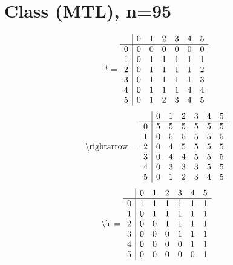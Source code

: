 \documentclass[11pt]{article}
\begin{document}
\section{Class (MTL), n=95}
\[\text{*} = 
\begin{array}{r | r r r r r r}
 & 0 & 1 & 2 & 3 & 4 & 5 \\ \hline
0 & 0 & 0 & 0 & 0 & 0 & 0 \\
1 & 0 & 1 & 1 & 1 & 1 & 1 \\
2 & 0 & 1 & 1 & 1 & 1 & 2 \\
3 & 0 & 1 & 1 & 1 & 1 & 3 \\
4 & 0 & 1 & 1 & 1 & 4 & 4 \\
5 & 0 & 1 & 2 & 3 & 4 & 5 \\
\end{array}
\]
\[\text{\textbackslash rightarrow} = 
\begin{array}{r | r r r r r r}
 & 0 & 1 & 2 & 3 & 4 & 5 \\ \hline
0 & 5 & 5 & 5 & 5 & 5 & 5 \\
1 & 0 & 5 & 5 & 5 & 5 & 5 \\
2 & 0 & 4 & 5 & 5 & 5 & 5 \\
3 & 0 & 4 & 4 & 5 & 5 & 5 \\
4 & 0 & 3 & 3 & 3 & 5 & 5 \\
5 & 0 & 1 & 2 & 3 & 4 & 5 \\
\end{array}
\]
\[\text{\textbackslash le} = 
\begin{array}{r | r r r r r r}
 & 0 & 1 & 2 & 3 & 4 & 5 \\ \hline
0 & 1 & 1 & 1 & 1 & 1 & 1 \\
1 & 0 & 1 & 1 & 1 & 1 & 1 \\
2 & 0 & 0 & 1 & 1 & 1 & 1 \\
3 & 0 & 0 & 0 & 1 & 1 & 1 \\
4 & 0 & 0 & 0 & 0 & 1 & 1 \\
5 & 0 & 0 & 0 & 0 & 0 & 1 \\
\end{array}
\]
\end{document}
